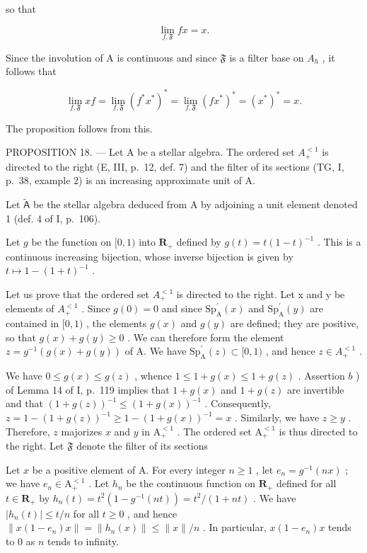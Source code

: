 so that

\[
\lim _ {f, \mathfrak {F}} f x = x.
\]

Since the involution of A is continuous and since \(\mathfrak{F}\) is a filter base on \(A_{h}\) , it follows that

\[
\lim _ {f, \mathfrak {F}} x f = \lim _ {f, \mathfrak {F}} (f ^ {*} x ^ {*}) ^ {*} = \lim _ {f, \mathfrak {F}} (f x ^ {*}) ^ {*} = (x ^ {*}) ^ {*} = x.
\]

The proposition follows from this.

PROPOSITION 18. --- Let A be a stellar algebra. The ordered set \(A_{+}^{<1}\) is directed to the right (E, III, p.~12, def. 7) and the filter of its sections (TG, I, p.~38, example 2) is an increasing approximate unit of A.

Let \(\widetilde{\mathsf{A}}\) be the stellar algebra deduced from A by adjoining a unit element denoted 1 (def. 4 of I, p.~106).

Let \(g\) be the function on \([0,1)\) into \(\mathbf{R}_+\) defined by \(g(t) = t(1 - t)^{-1}\) . This is a continuous increasing bijection, whose inverse bijection is given by \(t \mapsto 1 - (1 + t)^{-1}\) .

Let us prove that the ordered set \(A_{+}^{<1}\) is directed to the right. Let x and y be elements of \(A_{+}^{<1}\) . Since \(g(0)=0\) and since \(\mathrm{Sp}_{\mathrm{A}}^{\prime}(x)\) and \(\mathrm{Sp}_{\mathrm{A}}^{\prime}(y)\) are contained in \([0,1)\) , the elements \(g(x)\) and \(g(y)\) are defined; they are positive, so that \(g(x)+g(y)\geqslant0\) . We can therefore form the element \(z=g^{-1}(g(x)+g(y))\) of A. We have \(\mathrm{Sp}_{\mathrm{A}}^{\prime}(z)\subset[0,1)\) , and hence \(z\in A_{+}^{<1}\) .

We have \(0 \leqslant g(x) \leqslant g(z)\) , whence \(1 \leqslant 1 + g(x) \leqslant 1 + g(z)\) . Assertion \(b\) ) of Lemma 14 of I, p.~119 implies that \(1 + g(x)\) and \(1 + g(z)\) are invertible and that \((1 + g(z))^{-1} \leqslant (1 + g(x))^{-1}\) . Consequently, \(z = 1 - (1 + g(z))^{-1} \geqslant 1 - (1 + g(x))^{-1} = x\) . Similarly, we have \(z \geqslant y\) . Therefore, \(z\) majorizes \(x\) and \(y\) in \(\mathrm{A}_{+}^{<1}\) . The ordered set \(\mathrm{A}_{+}^{<1}\) is thus directed to the right. Let \(\mathfrak{F}\) denote the filter of its sections

Let \(x\) be a positive element of A. For every integer \(n \geqslant 1\) , let \(e_n = g^{-1}(nx)\) ; we have \(e_n \in \mathrm{A}_+^{<1}\) . Let \(h_n\) be the continuous function on \(\mathbf{R}_+\) defined for all \(t \in \mathbf{R}_+\) by \(h_n(t) = t^2(1 - g^{-1}(nt)) = t^2 / (1 + nt)\) . We have \(|h_n(t)| \leqslant t / n\) for all \(t \geqslant 0\) , and hence \(\| x(1 - e_n)x \| = \| h_n(x) \| \leqslant \| x \| / n\) . In particular, \(x(1 - e_n)x\) tends to 0 as \(n\) tends to infinity.


